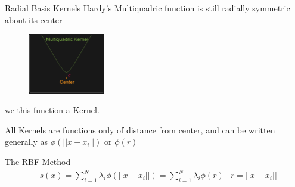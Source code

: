 \documentclass[12pt,t]{beamer}
\newcommand{\subt}[1]{{\footnotesize \color{subtitle} {#1}}}
\begin{document}
\begin{frame}{Radial Basis Kernels}
Hardy's Multiquadric function is still \subt{radially symmetric} about its center


\begin{figure}
\includegraphics[width=0.3\textwidth, keepaspectratio]{fig7.png}
\end{figure}
we this function a Kernel. 

All Kernels are functions only of distance from center, and can be written generally as $\phi(||x-x_i||)$ or $\phi(r)$

\subt{The RBF Method}
\begin{align*}
&s(x)=\sum_{i=1}^N \lambda_i \phi(||x-x_i||)=\sum_{i=1}^N \lambda_i \phi(r) &r=||x-x_i||
\end{align*}

\note{}
\end{frame}
\end{document}
